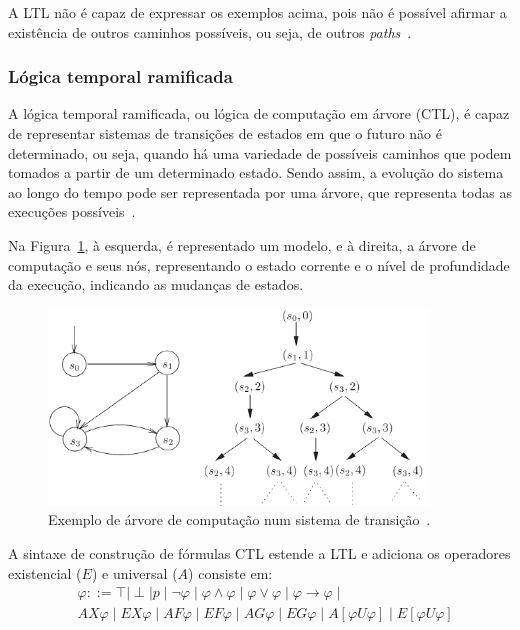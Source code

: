 A LTL não é capaz de expressar os exemplos acima, pois não é possível afirmar a existência de outros caminhos possíveis, ou seja, de outros \textit{paths}~\cite{huth2004logic}.

\subsubsection{Lógica temporal ramificada}

A lógica temporal ramificada, ou lógica de computação em árvore (CTL), é capaz de representar sistemas de transições de estados em que o futuro não é determinado, ou seja, quando há uma variedade de possíveis caminhos que podem tomados a partir de um determinado estado. Sendo assim, a evolução do sistema ao longo do tempo pode ser representada por uma árvore, que representa todas as execuções possíveis~\cite{huth2004logic}.

Na Figura~\ref{fig:ctl_ex}, à esquerda, é representado um modelo, e à direita, a árvore de computação e seus nós, representando o estado corrente e o nível de profundidade da execução, indicando as mudanças de estados.

\begin{figure}[ht]
	\centering
	\includegraphics[width=0.9\textwidth]{imagens/ctl_ex.png}
	\caption{Exemplo de árvore de computação num sistema de transição~\cite{huth2004logic}.
		\label{fig:ctl_ex}}
\end{figure}
\FloatBarrier

A sintaxe de construção de fórmulas CTL estende a LTL e adiciona os operadores existencial ($E$) e universal ($A$) consiste em:
\begin{align}
& \varphi ::= \top \mid \perp \mid p \mid \neg \varphi \mid \varphi \wedge \varphi \mid \varphi\vee\varphi \mid \varphi \to \varphi \mid \nonumber \\ 
& AX\varphi \mid EX\varphi \mid AF\varphi \mid EF\varphi \mid AG\varphi \mid EG\varphi \mid A[\varphi U \varphi]\mid E[\varphi U \varphi]
\end{align}

